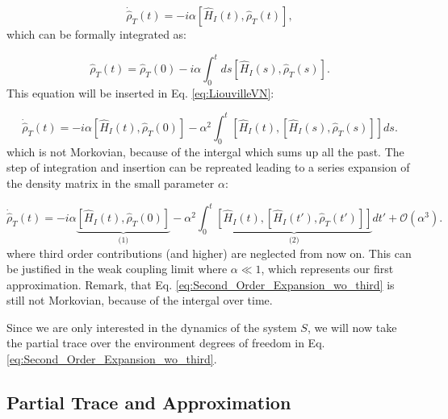 \begin{equation}
	\dot{\hat{\rho}}_T(t) = -i \alpha [\hat{H}_I(t), \hat{\rho}_T(t)],
	\label{eq:LiouvilleVN}
\end{equation}
which can be formally integrated as:

\begin{equation}
	\hat{\rho}_T(t) = \hat{\rho}_T(0) - i \alpha \int_0^t ds [\hat{H}_I(s), \hat{\rho}_T(s)].
	\label{eq:Formal_Integration}
\end{equation}
This equation will be inserted in Eq. \eqref{eq:LiouvilleVN}:

\begin{equation}
	\dot{\hat{\rho}}_T(t) = -i \alpha \left[ \hat{H}_I(t), \hat{\rho}_T(0) \right]
	- \alpha^2 \int_0^t \left[ \hat{H}_I(t), \left[ \hat{H}_I(s), \hat{\rho}_T(s) \right] \right] ds.
	\label{eq:Second_Order_Expansion}
\end{equation}
which is not Morkovian, because of the intergal which sums up all the past.
The step of integration and insertion can be repreated leading to a series expansion of the density matrix in the small parameter $\alpha$:

\begin{equation}
	\dot{\hat{\rho}}_T(t) = -i \alpha \underbrace{\left[ \hat{H}_I(t), \hat{\rho}_T(0) \right]}_{\text{(1)}}
	- \alpha^2 \int_0^t \underbrace{\left[ \hat{H}_I(t), \left[ \hat{H}_I(t'), \hat{\rho}_T(t') \right] \right]}_{\text{(2)}} dt' + \mathcal{O} (\alpha^3).
	\label{eq:Second_Order_Expansion_wo_third}
\end{equation}
where third order contributions (and higher) are neglected from now on.
This can be justified in the weak coupling limit where $ \alpha \ll 1 $, which represents our first approximation.
Remark, that Eq. \eqref{eq:Second_Order_Expansion_wo_third} is still not Morkovian, because of the intergal over time.

Since we are only interested in the dynamics of the system $ S $, we will now take the partial trace over the environment degrees of freedom in Eq. \eqref{eq:Second_Order_Expansion_wo_third}.


\subsection{Partial Trace and Approximation}
\label{subsec:Partial_Trace_Approximation}

